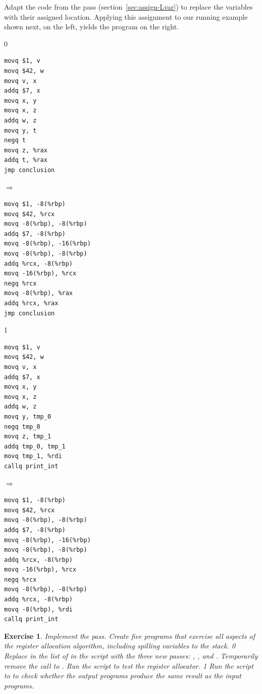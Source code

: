 \documentclass[7x10]{TimesAPriori_MIT}%
\def\racketEd{0}
\def\pythonEd{1}
\def\edition{0}
\newtheorem{exercise}[theorem]{Exercise}
\numberwithin{theorem}{chapter}
\numberwithin{definition}{chapter}
\numberwithin{equation}{chapter}
\begin{document}
Adapt the code from the  pass
(section~\ref{sec:assign-Lvar}) to replace the variables with their
assigned location. Applying this assignment to our running
example shown next, on the left, yields the program on the right.
\begin{center}
{\if\edition\racketEd      
\begin{minipage}{0.3\textwidth}
\begin{lstlisting}
movq $1, v
movq $42, w
movq v, x
addq $7, x
movq x, y
movq x, z
addq w, z
movq y, t
negq t
movq z, %rax
addq t, %rax
jmp conclusion
\end{lstlisting}
\end{minipage}
$\Rightarrow\qquad$
\begin{minipage}{0.45\textwidth}
\begin{lstlisting}
movq $1, -8(%rbp)
movq $42, %rcx
movq -8(%rbp), -8(%rbp)
addq $7, -8(%rbp)
movq -8(%rbp), -16(%rbp)
movq -8(%rbp), -8(%rbp)
addq %rcx, -8(%rbp)
movq -16(%rbp), %rcx
negq %rcx
movq -8(%rbp), %rax
addq %rcx, %rax
jmp conclusion
\end{lstlisting}
\end{minipage}
\fi}
{\if\edition\pythonEd
\begin{minipage}{0.3\textwidth}
\begin{lstlisting}
movq $1, v
movq $42, w
movq v, x
addq $7, x
movq x, y
movq x, z
addq w, z
movq y, tmp_0
negq tmp_0
movq z, tmp_1
addq tmp_0, tmp_1
movq tmp_1, %rdi
callq print_int
\end{lstlisting}
\end{minipage}
$\Rightarrow\qquad$
\begin{minipage}{0.45\textwidth}
\begin{lstlisting}
movq $1, -8(%rbp)
movq $42, %rcx
movq -8(%rbp), -8(%rbp)
addq $7, -8(%rbp)
movq -8(%rbp), -16(%rbp)
movq -8(%rbp), -8(%rbp)
addq %rcx, -8(%rbp)
movq -16(%rbp), %rcx
negq %rcx
movq -8(%rbp), -8(%rbp)
addq %rcx, -8(%rbp)
movq -8(%rbp), %rdi
callq print_int    
\end{lstlisting}
\end{minipage}
\fi}
\end{center}

\begin{exercise}\normalfont\normalsize
Implement the  pass.
Create five programs that exercise all aspects of the register
allocation algorithm, including spilling variables to the stack.
%
{\if\edition\racketEd      
Replace  in the list of  in the
 script with the three new passes:
, , and
.
Temporarily remove the call to .
Run the script to test the register allocator.
\fi}
%
{\if\edition\pythonEd      
Run the  script to to check whether the
output programs produce the same result as the input programs.
\fi}
\end{exercise}
\end{document}
